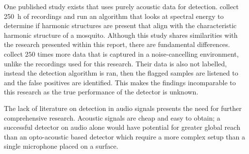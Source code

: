         One published study exists that uses purely acoustic data for detection. \textcite{D.R.Raman2007} collect \SI{250}{\hour} of recordings and run an algorithm that looks at spectral energy to determine if harmonic structures are present that align with the characteristic harmonic structure of a mosquito. Although this study shares similarities with the research presented within this report, there are fundamental differences. \textcite{D.R.Raman2007} collect $250$ times more data that is captured in a noise-cancelling environment, unlike the recordings used for this research. Their data is also not labelled, instead the detection algorithm is ran, then the flagged samples are listened to and the false positives are identified. This makes the findings incomparable to this research as the true performance of the detector is unknown.
        
        The lack of literature on detection in audio signals presents the need for further comprehensive research. Acoustic signals are cheap and easy to obtain; a successful detector on audio alone would have potential for greater global reach than an opto-acoustic based detector which require a more complex setup than a single microphone placed on a surface.
